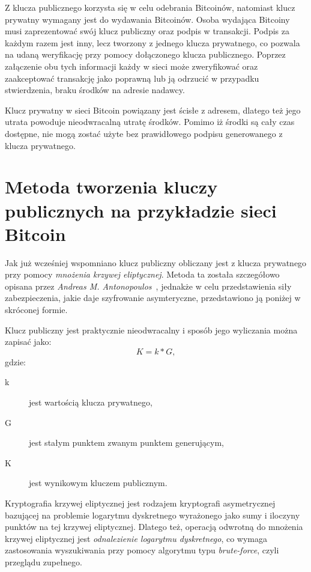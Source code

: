 \documentclass[12pt, oneside, final, openany]{mgr}
\begin{document}
\indent Z klucza publicznego korzysta się w celu odebrania Bitcoinów, natomiast klucz prywatny wymagany jest do wydawania Bitcoinów. Osoba wydająca Bitcoiny musi zaprezentować swój klucz publiczny oraz podpis w transakcji. Podpis za każdym razem jest inny, lecz tworzony z jednego klucza prywatnego, co pozwala na udaną weryfikację przy pomocy dołączonego klucza publicznego. Poprzez załączenie obu tych informacji każdy w sieci może zweryfikować oraz zaakceptować transakcję jako poprawną lub ją odrzucić w przypadku stwierdzenia, braku środków na adresie nadawcy. 

\indent Klucz prywatny w sieci Bitcoin powiązany jest ścisłe z adresem, dlatego też jego utrata powoduje nieodwracalną utratę środków. Pomimo iż środki są cały czas dostępne, nie mogą zostać użyte bez prawidłowego podpisu generowanego z klucza prywatnego.

\section{Metoda tworzenia kluczy publicznych na przykładzie sieci Bitcoin} \label{sec:tworzenieKluczyPublicznych}
\indent Jak już wcześniej wspomniano klucz publiczny obliczany jest z klucza prywatnego przy pomocy \textit{mnożenia krzywej eliptycznej}. Metoda ta została szczegółowo opisana przez \textit{Andreas M. Antonopoulos}~\cite{Mastering}, jednakże w celu przedstawienia siły zabezpieczenia, jakie daje szyfrowanie asymteryczne, przedstawiono ją poniżej w skróconej formie. 

\indent Klucz publiczny jest praktycznie nieodwracalny i sposób jego wyliczania można zapisać jako:
\begin{equation}
\label{eq:1}
  K = k*G, 
\end{equation} 
gdzie:
\begin{description}
\item[k] jest wartością klucza prywatnego,
\item[G] jest stałym punktem zwanym punktem generującym,
\item[K] jest wynikowym kluczem publicznym.
\end{description}

Kryptografia krzywej eliptycznej jest rodzajem kryptografi asymetrycznej bazującej na problemie logarytmu dyskretnego wyrażonego jako sumy i iloczyny punktów na tej krzywej eliptycznej. Dlatego też, operacją odwrotną do mnożenia krzywej eliptycznej jest \textit{odnalezienie logarytmu dyskretnego}, co wymaga zastosowania wyszukiwania przy pomocy algorytmu typu \textit{brute-force}, czyli przeglądu zupełnego.
\end{document}
